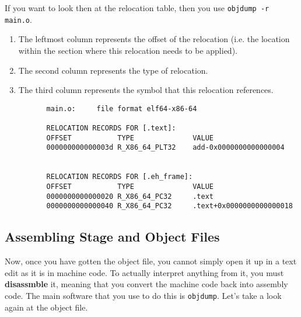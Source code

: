       \begin{theorem}
        If you want to look then at the relocation table, then you use \texttt{objdump -r main.o}. 
        \begin{enumerate}
          \item The leftmost column represents the offset of the relocation (i.e. the location within the section where this relocation needs to be applied). 
          \item The second column represents the type of relocation. 
          \item The third column represents the symbol that this relocation references. 
        \end{enumerate}
        \begin{lstlisting}
          main.o:     file format elf64-x86-64

          RELOCATION RECORDS FOR [.text]:
          OFFSET           TYPE              VALUE 
          000000000000003d R_X86_64_PLT32    add-0x0000000000000004


          RELOCATION RECORDS FOR [.eh_frame]:
          OFFSET           TYPE              VALUE 
          0000000000000020 R_X86_64_PC32     .text
          0000000000000040 R_X86_64_PC32     .text+0x0000000000000018
        \end{lstlisting}
      \end{theorem}

  \subsection{Assembling Stage and Object Files}

    Now, once you have gotten the object file, you cannot simply open it up in a text edit as it is in machine code. To actually interpret anything from it, you must \textbf{disassmble} it, meaning that you convert the machine code back into assembly code. The main software that you use to do this is \texttt{objdump}. Let's take a look again at the object file. 

